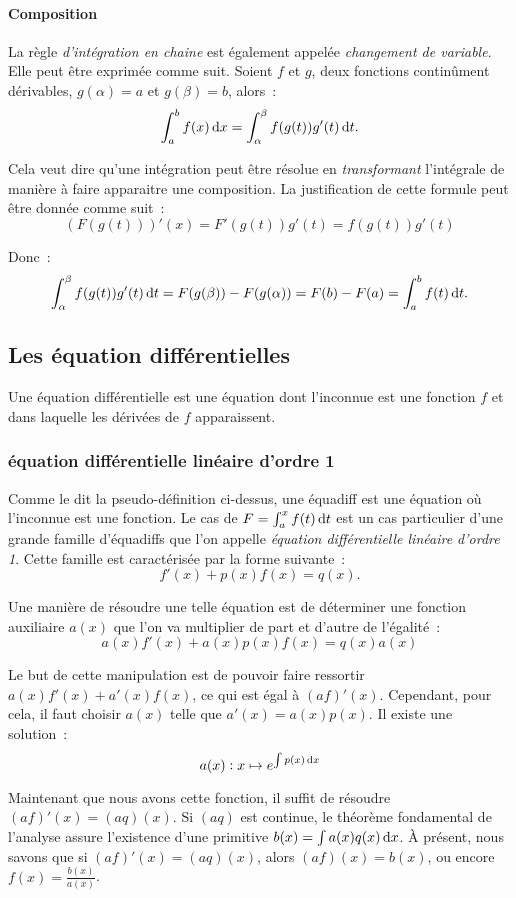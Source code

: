 \documentclass{article}
\theoremstyle{definition}
\theoremstyle{remark}
\begin{document}
			\paragraph{Composition}
				La règle \textit{d'intégration en chaine} est également appelée \textit{changement de variable}. Elle peut être exprimée comme
				suit. Soient $f$ et $g$, deux fonctions continûment dérivables, $g(\alpha) = a$ et $g(\beta) = b$, alors~:
				\[\int_a^bf(x)\dif x = \int_\alpha^\beta f(g(t))g'(t)\dif t.\]

				Cela veut dire qu'une intégration peut être résolue en \textit{transformant} l'intégrale de manière à faire apparaitre une
				composition. La justification de cette formule peut être donnée comme suit~:
				\[(F(g(t)))'(x) = F'(g(t))g'(t) = f(g(t))g'(t)\]

				Donc~:
				\[\int_\alpha^\beta f(g(t))g'(t) \dif t = F(g(\beta)) - F(g(\alpha)) = F(b) - F(a) = \int_a^bf(t)\dif t.\]

	\subsection{Les équation différentielles}
		Une équation différentielle est une équation dont l'inconnue est une fonction $f$ et dans laquelle les dérivées de $f$ apparaissent.

		\subsubsection{équation différentielle linéaire d'ordre 1}
			Comme le dit la pseudo-définition ci-dessus, une équadiff est une équation où l'inconnue est une fonction. Le cas de $F = \int_a^xf(t)\dif t$
			est un cas particulier d'une grande famille d'équadiffs que l'on appelle \textit{équation différentielle linéaire d'ordre 1}.
			Cette famille est caractérisée par la forme suivante~:
			\[f'(x) + p(x)f(x) = q(x).\]

			Une manière de résoudre une telle équation est de déterminer une fonction auxiliaire $a(x)$ que l'on va multiplier de part et d'autre
			de l'égalité~:
			\[a(x)f'(x) + a(x)p(x)f(x) = q(x)a(x)\]

			Le but de cette manipulation est de pouvoir faire ressortir $a(x)f'(x) + a'(x)f(x)$, ce qui est égal à $(af)'(x)$. Cependant, pour cela,
			il faut choisir $a(x)$ telle que $a'(x) = a(x)p(x)$. Il existe une solution~:
			\[a(x) : x \mapsto e^{\int p(x)\dif x}\]

			Maintenant que nous avons cette fonction, il suffit de résoudre $(af)'(x) = (aq)(x)$. Si $(aq)$ est continue, le théorème fondamental de
			l'analyse assure l'existence d'une primitive $b(x) = \int a(x)q(x)\dif x$. À présent, nous savons que si $(af)'(x) = (aq)(x)$, alors
			$(af)(x) = b(x)$, ou encore $f(x) = \frac {b(x)}{a(x)}$.
\end{document}
